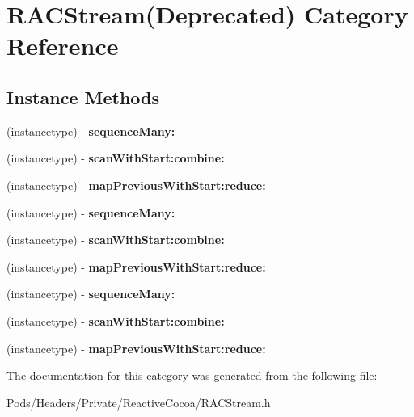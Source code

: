 \hypertarget{category_r_a_c_stream_07_deprecated_08}{}\section{R\+A\+C\+Stream(Deprecated) Category Reference}
\label{category_r_a_c_stream_07_deprecated_08}
\subsection*{Instance Methods}
\begin{DoxyCompactItemize}
\item 
\mbox{\label{category_r_a_c_stream_07_deprecated_08_a4c7538547d03c835dbe8fa457cfe9312}} 
(instancetype) -\/ {\bfseries sequence\+Many\+:}
\item 
\mbox{\label{category_r_a_c_stream_07_deprecated_08_a788aca316c8bc84235e1692f47229647}} 
(instancetype) -\/ {\bfseries scan\+With\+Start\+:combine\+:}
\item 
\mbox{\label{category_r_a_c_stream_07_deprecated_08_a2fdc837005c8c163afa1af126888ca83}} 
(instancetype) -\/ {\bfseries map\+Previous\+With\+Start\+:reduce\+:}
\item 
\mbox{\label{category_r_a_c_stream_07_deprecated_08_a4c7538547d03c835dbe8fa457cfe9312}} 
(instancetype) -\/ {\bfseries sequence\+Many\+:}
\item 
\mbox{\label{category_r_a_c_stream_07_deprecated_08_a788aca316c8bc84235e1692f47229647}} 
(instancetype) -\/ {\bfseries scan\+With\+Start\+:combine\+:}
\item 
\mbox{\label{category_r_a_c_stream_07_deprecated_08_a2fdc837005c8c163afa1af126888ca83}} 
(instancetype) -\/ {\bfseries map\+Previous\+With\+Start\+:reduce\+:}
\item 
\mbox{\label{category_r_a_c_stream_07_deprecated_08_a4c7538547d03c835dbe8fa457cfe9312}} 
(instancetype) -\/ {\bfseries sequence\+Many\+:}
\item 
\mbox{\label{category_r_a_c_stream_07_deprecated_08_a788aca316c8bc84235e1692f47229647}} 
(instancetype) -\/ {\bfseries scan\+With\+Start\+:combine\+:}
\item 
\mbox{\label{category_r_a_c_stream_07_deprecated_08_a2fdc837005c8c163afa1af126888ca83}} 
(instancetype) -\/ {\bfseries map\+Previous\+With\+Start\+:reduce\+:}
\end{DoxyCompactItemize}


The documentation for this category was generated from the following file\+:\begin{DoxyCompactItemize}
\item 
Pods/\+Headers/\+Private/\+Reactive\+Cocoa/R\+A\+C\+Stream.\+h\end{DoxyCompactItemize}
